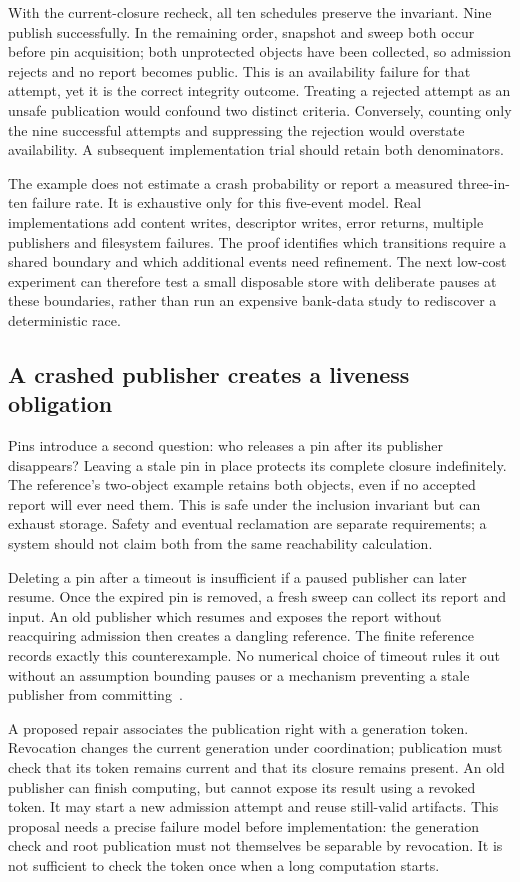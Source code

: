 With the current-closure recheck, all ten schedules preserve the invariant. Nine publish successfully. In the remaining order, snapshot and sweep both occur before pin acquisition; both unprotected objects have been collected, so admission rejects and no report becomes public. This is an availability failure for that attempt, yet it is the correct integrity outcome. Treating a rejected attempt as an unsafe publication would confound two distinct criteria. Conversely, counting only the nine successful attempts and suppressing the rejection would overstate availability. A subsequent implementation trial should retain both denominators.

The example does not estimate a crash probability or report a measured three-in-ten failure rate. It is exhaustive only for this five-event model. Real implementations add content writes, descriptor writes, error returns, multiple publishers and filesystem failures. The proof identifies which transitions require a shared boundary and which additional events need refinement. The next low-cost experiment can therefore test a small disposable store with deliberate pauses at these boundaries, rather than run an expensive bank-data study to rediscover a deterministic race.

\subsection{A crashed publisher creates a liveness obligation}
Pins introduce a second question: who releases a pin after its publisher disappears? Leaving a stale pin in place protects its complete closure indefinitely. The reference's two-object example retains both objects, even if no accepted report will ever need them. This is safe under the inclusion invariant but can exhaust storage. Safety and eventual reclamation are separate requirements; a system should not claim both from the same reachability calculation.

Deleting a pin after a timeout is insufficient if a paused publisher can later resume. Once the expired pin is removed, a fresh sweep can collect its report and input. An old publisher which resumes and exposes the report without reacquiring admission then creates a dangling reference. The finite reference records exactly this counterexample. No numerical choice of timeout rules it out without an assumption bounding pauses or a mechanism preventing a stale publisher from committing~\citep{exec17_retention_reference}.

A proposed repair associates the publication right with a generation token. Revocation changes the current generation under coordination; publication must check that its token remains current and that its closure remains present. An old publisher can finish computing, but cannot expose its result using a revoked token. It may start a new admission attempt and reuse still-valid artifacts. This proposal needs a precise failure model before implementation: the generation check and root publication must not themselves be separable by revocation. It is not sufficient to check the token once when a long computation starts.

